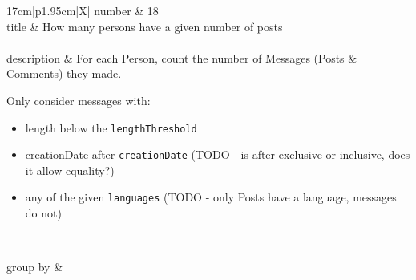 \renewcommand*{\arraystretch}{1.1}

\noindent\begin{tabularx}{17cm}{|p{1.95cm}|X|}
	\hline
	number      & 18                                                          \\ \hline
%
	title       & How many persons have a given number of posts                                                           \\ \hline
	 \\ \hline
	description & For each Person, count the number of Messages (Posts \& Comments) they
made.

Only consider messages with:

\begin{itemize}
\tightlist
\item
  length below the \texttt{lengthThreshold}
\item
  creationDate after \texttt{creationDate} (TODO - is after exclusive or
  inclusive, does it allow equality?)
\item
  any of the given \texttt{languages} (TODO - only Posts have a
  language, messages do not)
\end{itemize}
 \\ \hline
	
%
	group by       &
	 \\ \hline
	

\end{tabularx}
